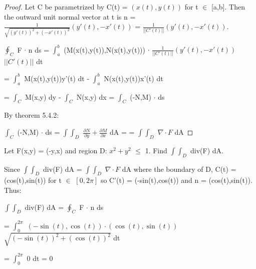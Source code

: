     \begin{proof}
        Let C be parametrized by C(t) = $(x(t),y(t))$ for t $\in$ [a,b].
        Then the outward unit normal vector at t is
        n = $\frac{1}{\sqrt{(y'(t))^2+(-x'(t))^2}} (y'(t),-x'(t))$
        = $\frac{1}{||C'(t)||} (y'(t),-x'(t))$.

        \hspace{0.5cm}
        $\oint_C$ F $\cdot$ n ds
        = $\int_a^b$ (M(x(t),y(t)),N(x(t),y(t)))
                        $\cdot$ $\frac{1}{||C'(t)||} (y'(t),-x'(t))$
                        $||C'(t)||$ dt
        
        \hspace{2.6cm}
        = $\int_a^b$ M(x(t),y(t))y'(t) dt - 
            $\int_a^b$ N(x(t),y(t))x'(t) dt

        \hspace{2.6cm}
        = $\int_C$ M(x,y) dy - 
            $\int_C$ N(x,y) dx
        = $\int_C$ (-N,M) $\cdot$ ds

        By {\color{red} theorem 5.4.2}:

        \hspace{0.5cm}
        $\int_C$ (-N,M) $\cdot$ ds
        = $\int \int_D$ $\frac{\partial N}{\partial y}
                        + \frac{\partial M}{\partial x}$ dA
        = = $\int \int_D$ $\nabla \cdot F$ dA
    \end{proof}

    \vspace{0.5cm}



    \begin{example}
        Let F(x,y) = (-y,x) and region D: $x^2 + y^2$ $\leq$ 1.
        Find $\int \int_D$ div(F) dA.
    \end{example}

    \begin{tbox}
        Since $\int \int_D$ div(F) dA
        = $\int \int_D$ $\nabla \cdot F$ dA
        where the boundary of D, C(t) = (cos(t),sin(t)) for t $\in$ $[0,2\pi]$
        so C'(t) = (-sin(t),cos(t)) and n = (cos(t),sin(t)). Thus:

        \hspace{0.5cm}
        $\int \int_D$ div(F) dA
        = $\oint_C$ F $\cdot$ n ds

        \hspace{0.5cm}
        = $\int_0^{2\pi}$ $(-\sin(t),\cos(t)) \cdot (\cos(t),\sin(t))$
                            $\sqrt{(-\sin(t))^2+(\cos(t))^2}$ dt

        \hspace{0.5cm}
        = $\int_0^{2\pi}$ 0 dt
        = 0
    \end{tbox}

